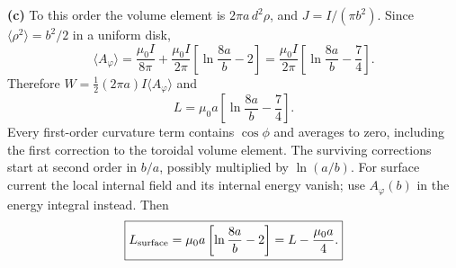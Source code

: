 \textbf{(c)} To this order the volume element is
$2\pi a\,d^2\rho$, and $J=I/(\pi b^2)$.
Since $\langle\rho^2\rangle=b^2/2$ in a uniform disk,
\[
\langle A_\varphi\rangle
=\frac{\mu_0I}{8\pi}
+\frac{\mu_0I}{2\pi}\left[\ln\frac{8a}{b}-2\right]
=\frac{\mu_0I}{2\pi}\left[\ln\frac{8a}{b}-\frac74\right].
\]
Therefore
$W=\tfrac12(2\pi a)I\langle A_\varphi\rangle$
and
\[
\boxed{L=\mu_0a\left[\ln\frac{8a}{b}-\frac74\right].}
\]
Every first-order curvature term contains $\cos\phi$ and averages
to zero, including the first correction to the toroidal volume
element. The surviving corrections start at second order in $b/a$,
possibly multiplied by $\ln(a/b)$.
For surface current the local internal field and its internal energy
vanish; use $A_\varphi(b)$ in the energy integral instead. Then
\[
\boxed{L_{\rm surface}=\mu_0a\left[\ln\frac{8a}{b}-2\right]
=L-\frac{\mu_0a}{4}.}
\]


